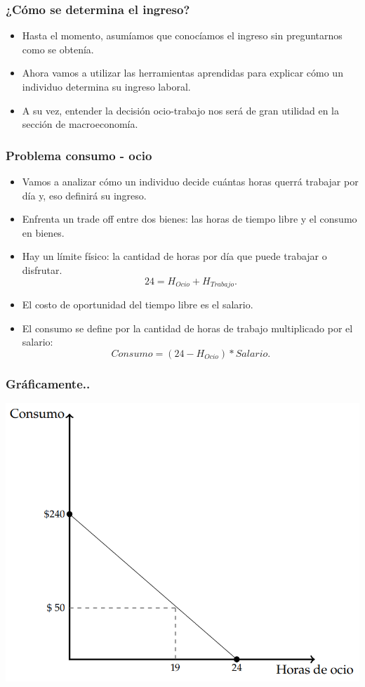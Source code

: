 \documentclass{beamer}
\begin{document}
\begin{frame}
\frametitle{¿Cómo se determina el ingreso?}
\begin{itemize}
    \item Hasta el momento, asumíamos que  conocíamos el ingreso sin preguntarnos como se obtenía. 
    \item Ahora vamos a utilizar las herramientas aprendidas para explicar cómo un individuo determina su ingreso laboral.
    \item A su vez, entender la decisión ocio-trabajo nos será de gran utilidad en la sección de macroeconomía. 
\end{itemize}
\end{frame}


\begin{frame}
\frametitle{Problema consumo - ocio}
\begin{itemize}
    \item Vamos a analizar cómo un individuo decide cuántas horas querrá trabajar por día y, eso definirá su ingreso.
    \item Enfrenta un trade off entre dos bienes: las horas de tiempo libre y el consumo en bienes.
    \item Hay un límite físico: la cantidad de horas por día que puede trabajar o disfrutar.
    \begin{equation}
     24 = H_{Ocio} + H_{Trabajo}.
    \end{equation}
    \item El costo de oportunidad del tiempo libre es el salario. 
    \item El consumo se define por la cantidad de horas de trabajo multiplicado por el salario:
    \begin{equation}
    Consumo = (24-H_{Ocio}) * Salario. 
    \end{equation}
\end{itemize}
\end{frame}


\begin{frame}
\frametitle{Gráficamente..}
\begin{center}
  \includegraphics[scale=0.6]{../Figures/C9.1.png}
\end{center}
\end{frame}
\end{document}
